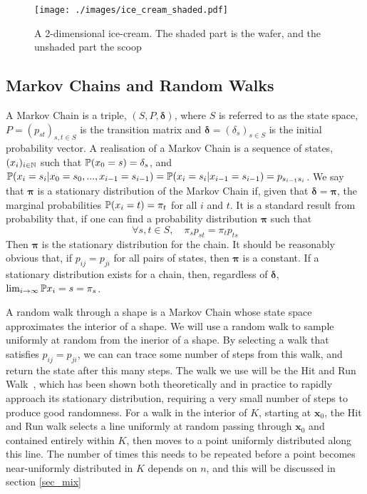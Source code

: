 \begin{figure}
\centering
\texttt{[image: ./images/ice\_cream\_shaded.pdf]}
\caption{A 2-dimensional ice-cream. The shaded part is the wafer, and the unshaded part the scoop}
\label{fig_ice_cream}
\end{figure}
\subsection{Markov Chains and Random Walks}

A Markov Chain is a triple, $(S,P,\bm{\delta})$, where $S$ is referred to as the state space, $P = (p_{st})_{s,t \in S}$ is the transition matrix and $\bm{\delta} = (\delta_s)_{s \in S}$ is the initial probability vector. A realisation of a Markov Chain is a sequence of states, $(x_i)_{i \in \mathbb{N}}$ such that $\mathbb{P} (x_0 = s)=\delta_s$, and $\mathbb{P}(x_i = s_i | x_0 = s_0, ..., x_{i-1} = s_{i-1}) = \mathbb{P} (x_i = s_i | x_{i-1} = s_{i-1})= p_{s_{i-1}s_{i}}$. We say that $\bm{\pi}$ is a stationary distribution of the Markov Chain if, given that $\bm{\delta} = \bm{\pi}$, the marginal probabilities $\mathbb{P}(x_i = t) = \pi_t$ for all $i$ and $t$.  It is a standard result from probability that, if one can find a probability distribution $\bm{\pi}$ such that
$$
\forall s,t \in S, \quad \pi_s p_{st} = \pi_t p_{ts}
$$
Then $\bm{\pi}$ is the stationary distribution for the chain. It should be reasonably obvious that, if $p_{ij} = p_{ji}$ for all pairs of states, then $\bm{\pi}$ is a constant. If a stationary distribution exists for a chain, then, regardless of $\bm{\delta}$, $\lim_{i-> \infty} \mathbb{P} {x_i = s} = \pi_s$.

A random walk through a shape is a Markov Chain whose state space approximates the interior of a shape. We will use a random walk to sample uniformly at random from the inerior of a shape. By selecting a walk that satisfies $p_{ij} = p_{ji}$, we can can trace some number of steps from this walk, and return the state after this many steps. The walk we use will be the Hit and Run Walk~\cite{Lovasz03a}, which has been shown both theoretically and in practice to rapidly approach its stationary distribution, requiring a very small number of steps to produce good randomness. For a walk in the interior of $K$, starting at $\bm{x}_0$, the Hit and Run walk selects a line uniformly at random passing through $\bm{x}_0$ and contained entirely within $K$, then moves to a point uniformly distributed along this line. The number of times this needs to be repeated before a point becomes near-uniformly distributed in $K$ depends on $n$, and this will be discussed in section \ref{sec_mix}

